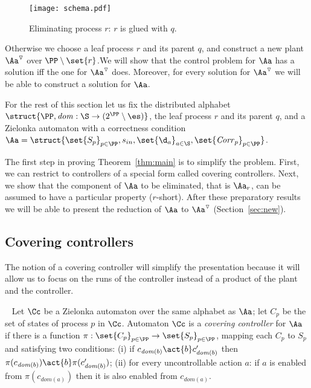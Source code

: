 \documentclass[10pt,a4paper]{article}
\newcommand{\igw}[1]{}
\newcommand{\Cor}{\mathit{Corr}}
\newcommand{\red}[1]{#1^\triangledown}
\newcommand{\loc}{\mathit{dom}}
\begin{document}
 \begin{figure}[htb]
\centerline{ \texttt{[image: schema.pdf]}}
\caption{Eliminating process $r$: $r$ is glued with $q$.}   
   \label{fig:schema}
 \end{figure}

Otherwise we choose a leaf process
$r$ and its parent $q$, and construct a new plant $\red\Aa$ over $\PP
\setminus \set{r}$.We will show that the control
problem for $\Aa$ 
has a solution iff the one for $\red\Aa$ does. Moreover, for
every solution for $\red\Aa$ we will be able to construct a solution
for $\Aa$. 


For the rest of this section let us fix the distributed alphabet
$\struct{\PP,\loc:\S\to (2^\PP \setminus \es)}$, 
the leaf process $r$ and
its parent $q$, and  a Zielonka automaton with a correctness
condition $\Aa=\struct{\set{S_p}_{p\in \PP},s_{in},\set{\d_a}_{a\in\S},
\set{\Cor_p}_{p\in \PP}}$.


The first step in proving Theorem~\ref{thm:main} is to simplify the
problem. First,  we can restrict to controllers of a special form
called covering controllers. Next, we show that the component of $\Aa$
to be eliminated, that is $\Aa_r$, can be assumed to have a particular property
($r$-short). After these preparatory results we will be able to present
the reduction of $\Aa$ to $\red \Aa$ (Section~\ref{sec:new}).

\subsection{Covering controllers}


The notion of a covering controller will simplify the presentation
because it will allow us to focus on the runs of the controller
instead of a product of the plant and the controller.\igw{refer to the
  example}

\begin{definition}~\label{df:covering controller}
  Let $\Cc$ be a Zielonka automaton over the same alphabet as $\Aa$;
  let $C_p$ be the set of states of process $p$ in $\Cc$. 
  Automaton $\Cc$ is a \emph{covering controller} for $\Aa$ if
  there is a function $\pi :\set{C_p}_{p\in \PP} \to \set{S_p}_{p\in
    \PP}$, mapping each $C_p$ to $S_p$ and satisfying two conditions:
  (i)  if $c_{\loc(b)} \act{b} c'_{\loc(b)}$ then
  $\pi(c_{\loc(b)})\act{b}\pi(c'_{\loc(b)})$; (ii) for
  every uncontrollable action $a$: if $a$ is enabled from
  $\pi(c_{\loc(a)})$ then it is also enabled from $c_{\loc(a)}$.
\end{definition}
\end{document}
